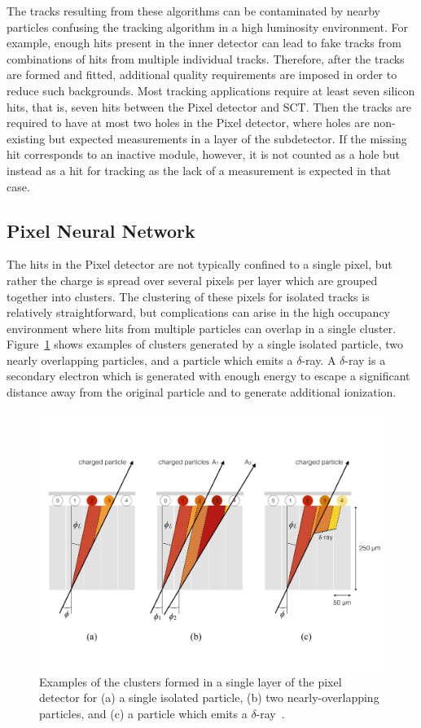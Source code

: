 The tracks resulting from these algorithms can be contaminated by nearby particles confusing the tracking algorithm in a high luminosity environment.
For example, enough hits present in the inner detector can lead to fake tracks from combinations of hits from multiple individual tracks.
Therefore, after the tracks are formed and fitted, additional quality requirements are imposed in order to reduce such backgrounds.
Most tracking applications require at least seven silicon hits, that is, seven hits between the Pixel detector and \ac{SCT}.
Then the tracks are required to have at most two holes in the Pixel detector, where holes are non-existing but expected measurements in a layer of the subdetector.
If the missing hit corresponds to an inactive module, however, it is not counted as a hole but instead as a hit for tracking as the lack of a measurement is expected in that case.

\subsection{Pixel Neural Network}

The hits in the Pixel detector are not typically confined to a single pixel, but rather the charge is spread over several pixels per layer which are grouped together into clusters.
The clustering of these pixels for isolated tracks is relatively straightforward, but complications can arise in the high occupancy environment where hits from multiple particles can overlap in a single cluster.
Figure~\ref{fig:pixel_cluster_types} shows examples of clusters generated by a single isolated particle, two nearly overlapping particles, and a particle which emits a $\delta$-ray. 
A $\delta$-ray is a secondary electron which is generated with enough energy to escape a significant distance away from the original particle and to generate additional ionization.

\begin{figure}
\includegraphics[width=\fullfig]{figures/pixel_cluster_types.pdf}
\caption{Examples of the clusters formed in a single layer of the pixel detector for (a) a single isolated particle, (b) two nearly-overlapping particles, and (c) a particle which emits a $\delta$-ray~\cite{pixel_nn}.}
\label{fig:pixel_cluster_types}
\end{figure}


